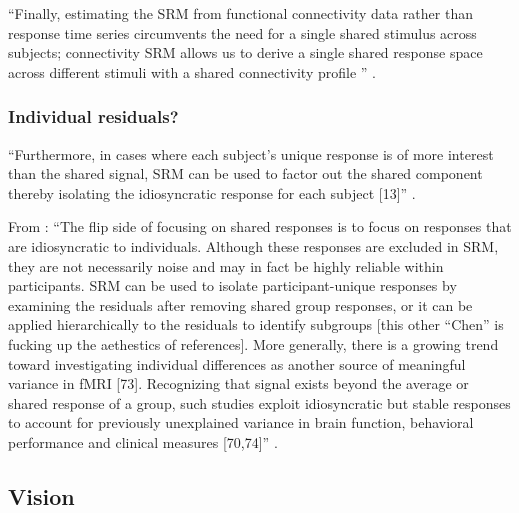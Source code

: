 
``Finally, estimating the SRM from functional connectivity
data rather than response time series circumvents the need for a single shared
stimulus across subjects; connectivity SRM allows us to derive a single shared
response space across different stimuli with a shared connectivity profile
\citep{nastase2019leveraging}'' \citep{kumar2020brainiak}.


\subsubsection{Individual residuals?}


%
``Furthermore, in cases where each subject's unique response is of more interest
than the shared signal, SRM can be used to factor out the shared component
thereby isolating the idiosyncratic response for each subject [13]''
\citep{kumar2020brainiak}.

From \citep{cohen2017computational}: ``The flip side of focusing on shared
responses is to focus on responses that are idiosyncratic to individuals.
Although these responses are excluded in SRM, they are not necessarily noise and
may in fact be highly reliable within participants.  SRM can be used to isolate
participant-unique responses by examining the residuals after removing shared
group responses, or it can be applied hierarchically to the residuals to
identify subgroups \citep{chen2017shared} \citep{cohen2017computational} [this
other ``Chen'' is fucking up the aethestics of references].  More generally,
there is a growing trend toward investigating individual differences as another
source of meaningful variance in fMRI [73].  Recognizing that signal exists
beyond the average or shared response of a group, such studies exploit
idiosyncratic but stable responses to account for previously unexplained
variance in brain function, behavioral performance and clinical measures
[70,74]'' \citep{cohen2017computational}.



\subsection{Vision}

